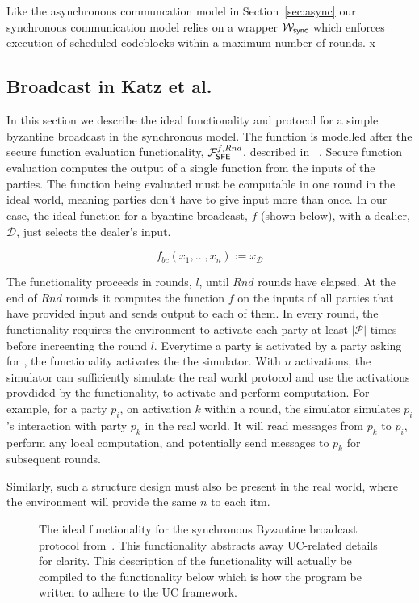 Like the asynchronous communcation model in Section~\ref{sec:async} our synchronous communication model relies on a wrapper $\mathcal{W}_{{\mathsf {sync}}}$ which enforces execution of scheduled codeblocks within a maximum number of rounds.
x


\subsection{Broadcast in Katz et al.}

In this section we describe the ideal functionality and protocol for a simple byzantine broadcast in the synchronous model.
The function is modelled after the secure function evaluation functionality, $\mathcal{F}_{{\mathsf {SFE}}}^{f,Rnd}$, described in ~\cite{katz-clock}.
Secure function evaluation computes the output of a single function from the inputs of the parties.
The function being evaluated must be computable in one round in the ideal world, meaning parties don't have to give input more than once.
In our case, the ideal function for a byantine broadcast, $f$ (shown below), with a dealier, $\mathcal{D}$, just selects the dealer's input.

\[ f_{bc}(x_1,...,x_n) := x_{\mathcal{D}} \]

The functionality proceeds in rounds, $l$, until $Rnd$ rounds have elapsed.
At the end of $Rnd$ rounds it computes the function $f$ on the inputs of all parties that have provided input and sends output to each of them.
In every round, the functionality requires the environment to activate each party at least $|\mathcal{P}|$ times before increenting the round $l$. 
Everytime a party is activated by a party asking for , the functionality activates the the simulator.
With $n$ activations, the simulator can sufficiently simulate the real world protocol and use the activations provdided by the functionality, to activate and perform computation.
For example, for a party $p_i$, on activation $k$ within a round, the simulator simulates $p_i$'s interaction with party $p_k$ in the real world.
It will read messages from $p_k$ to $p_i$, perform any local computation, and potentially send messages to $p_k$ for subsequent rounds.

Similarly, such a structure design must also be present in the real world, where the environment will provide the same $n$  to each itm.

\begin{figure}[!h]
	
	\label{fig:functionality:broadcast_high}
	\caption{The ideal functionality for the synchronous Byzantine broadcast protocol from~\cite{bracha}. This functionality abstracts away UC-related details for clarity. This description of the functionality will actually be compiled to the functionality below which is how the program be written to adhere to the UC framework.}
\end{figure}

